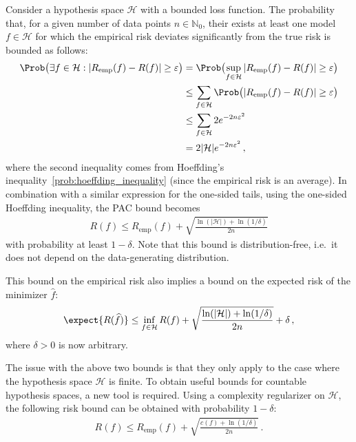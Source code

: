     \begin{property}
        Consider a hypothesis space $\mathcal{H}$ with a bounded loss function. The probability that, for a given number of data points $n\in\mathbb{N}_0$, their exists at least one model $f\in\mathcal{H}$ for which the empirical risk deviates significantly from the true risk is bounded as follows:
        \begin{gather}
            \begin{aligned}
                \Prob\bigl(\exists f\in\mathcal{H}:|R_{\text{emp}}(f)-R(f)|\geq\varepsilon\bigr) &= \Prob\bigl(\sup_{f\in\mathcal{H}}|R_{\text{emp}}(f)-R(f)|\geq\varepsilon\bigr)\nonumber\\
                &\leq\sum_{f\in\mathcal{H}}\Prob\bigl(|R_{\text{emp}}(f)-R(f)|\geq\varepsilon\bigr)\nonumber\\
                &\leq\sum_{f\in\mathcal{H}}2e^{-2n\varepsilon^2}\nonumber\\
                &=2|\mathcal{H}|e^{-2n\varepsilon^2}\,,
            \end{aligned}
        \end{gather}
        where the second inequality comes from Hoeffding's inequality~\ref{prob:hoeffding_inequality} (since the empirical risk is an average). In combination with a similar expression for the one-sided tails, using the one-sided Hoeffding inequality, the PAC bound becomes
        \begin{gather}
            R(f)\leq R_{\text{emp}}(f) + \sqrt{\frac{\ln(|\mathcal{H}|)+\ln(1/\delta)}{2n}}
        \end{gather}
        with probability at least $1-\delta$. Note that this bound is distribution-free, i.e.~it does not depend on the data-generating distribution.

        This bound on the empirical risk also implies a bound on the expected risk of the minimizer $\widehat{f}$:
        \begin{gather}
            \expect{R(\widehat{f})}\leq\inf_{f\in\mathcal{H}}R(f)+\sqrt{\frac{\ln(|\mathcal{H}|)+\ln(1/\delta)}{2n}}+\delta\,,
        \end{gather}
        where $\delta>0$ is now arbitrary.
    \end{property}

    The issue with the above two bounds is that they only apply to the case where the hypothesis space $\mathcal{H}$ is finite. To obtain useful bounds for countable hypothesis spaces, a new tool is required.
    Using a complexity regularizer on $\mathcal{H}$, the following risk bound can be obtained with probability $1-\delta$:
    \begin{gather}
        R(f)\leq R_{\text{emp}}(f) + \sqrt{\frac{c(f)+\ln(1/\delta)}{2n}}\,.
    \end{gather}

